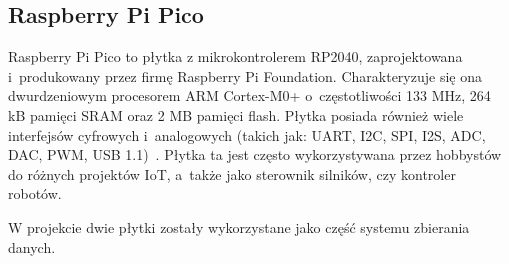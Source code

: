 \subsection{Raspberry Pi Pico}

Raspberry Pi Pico to płytka z mikrokontrolerem RP2040, zaprojektowana i~produkowany przez firmę Raspberry Pi Foundation.
Charakteryzuje się ona dwurdzeniowym procesorem ARM Cortex-M0+ o~częstotliwości 133 MHz, 264 kB pamięci SRAM oraz 2 MB pamięci flash.
Płytka posiada również wiele interfejsów cyfrowych i~analogowych (takich jak: UART, I2C, SPI, I2S, ADC, DAC, PWM, USB 1.1)~\cite{PICO:datasheet}.
Płytka ta jest często wykorzystywana przez hobbystów do różnych projektów IoT, a~także jako sterownik silników, czy kontroler robotów\cite{PICO:doc}.

W projekcie dwie płytki zostały wykorzystane jako część systemu zbierania danych.


